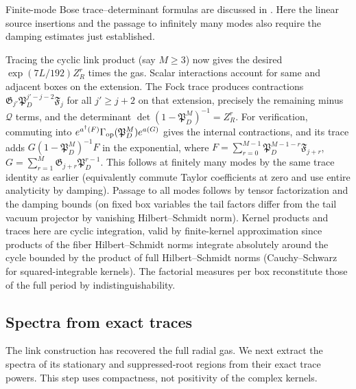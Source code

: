 Finite-mode Bose trace--determinant formulas are discussed in \cite[Section~2]{Klich2002}. Here the linear source insertions and the passage to infinitely many modes also require the damping estimates just established.

Tracing the cyclic link product (say \(M\ge3\)) now gives the desired \(\exp(7L/192)Z_R^r\) times the gas. Scalar interactions account for same and adjacent boxes on the extension. The Fock trace produces contractions \(\mathfrak G_{j'}\mathfrak P_D^{j'-j-2}\mathfrak F_j\) for all \(j'\ge j+2\) on that extension, precisely the remaining minus \(\mathcal Q\) terms, and the determinant \(\det(1-\mathfrak P_D^M)^{-1}=Z_R^r\). For verification, commuting into \(e^{a^\dagger(F)}\Gamma_{\rm op}(\mathfrak P_D^M)e^{a(G)}\) gives the internal contractions, and its trace adds \(G(1-\mathfrak P_D^M)^{-1}F\) in the exponential, where \(F=\sum_{r=0}^{M-1}\mathfrak P_D^{M-1-r}\mathfrak F_{j+r}\), \(G=\sum_{r=1}^M \mathfrak G_{j+r}\mathfrak P_D^{r-1}\). This follows at finitely many modes by the same trace identity as earlier (equivalently commute Taylor coefficients at zero and use entire analyticity by damping). Passage to all modes follows by tensor factorization and the damping bounds (on fixed box variables the tail factors differ from the tail vacuum projector by vanishing Hilbert--Schmidt norm). Kernel products and traces here are cyclic integration, valid by finite-kernel approximation since products of the fiber Hilbert--Schmidt norms integrate absolutely around the cycle bounded by the product of full Hilbert--Schmidt norms (Cauchy--Schwarz for squared-integrable kernels). The factorial measures per box reconstitute those of the full period by indistinguishability.

\subsection{Spectra from exact traces}

The link construction has recovered the full radial gas. We next extract the spectra of its stationary and suppressed-root regions from their exact trace powers. This step uses compactness, not positivity of the complex kernels.

